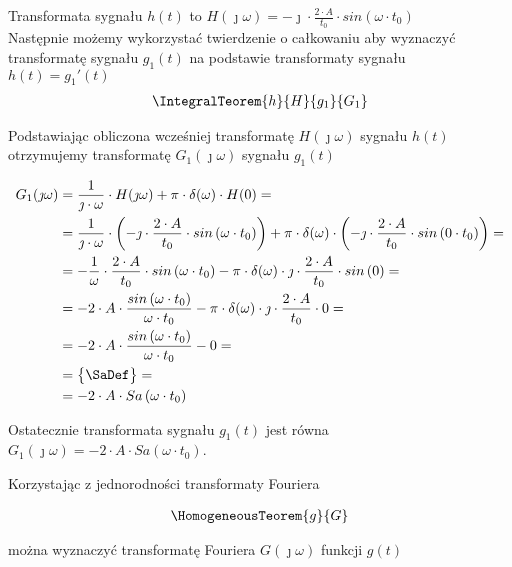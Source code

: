 \begin{task}
Transformata sygnału $h(t)$ to $H(\jmath \omega)=-\jmath \cdot \frac{2\cdot A}{t_0} \cdot sin\left( \omega \cdot t_0\right)$
\\

Następnie możemy wykorzystać twierdzenie o całkowaniu aby wyznaczyć transformatę sygnału $g_1(t)$ na podstawie transformaty sygnału $h(t)=g_1'(t)$
\begin{align*}
\IntegralTeorem{h}{H}{g_1}{G_1}
\end{align*}

Podstawiając obliczona wcześniej transformatę $H(\jmath \omega)$ sygnału $h(t)$ otrzymujemy transformatę $G_1(\jmath \omega)$ sygnału $g_1(t)$

\begin{align*}
G_1(\jmath \omega) &= \frac{1}{\jmath \cdot \omega} \cdot H(\jmath \omega) + \pi \cdot \delta(\omega) \cdot H(0)=\\
&=\frac{1}{\jmath \cdot \omega} \cdot \left(-\jmath \cdot \frac{2\cdot A}{t_0} \cdot sin\left( \omega \cdot t_0\right)\right) + \pi \cdot \delta(\omega) \cdot \left(-\jmath \cdot \frac{2\cdot A}{t_0} \cdot sin\left( 0 \cdot t_0\right)\right)=\\
&=-\frac{1}{\omega} \cdot \frac{2\cdot A}{t_0}\cdot sin\left( \omega \cdot t_0\right) - \pi \cdot \delta(\omega) \cdot \jmath \cdot \frac{2\cdot A}{t_0} \cdot sin\left( 0\right)=\\
&=-2\cdot A \cdot \frac{sin\left( \omega \cdot t_0\right)}{\omega \cdot t_0} - \pi \cdot \delta(\omega) \cdot \jmath \cdot \frac{2\cdot A}{t_0} \cdot 0=\\
&= -2\cdot A \cdot \frac{sin\left( \omega \cdot t_0\right)}{\omega \cdot t_0} - 0=\\
&=\begin{Bmatrix}
\SaDef
\end{Bmatrix}=\\
&=-2\cdot A \cdot Sa\left( \omega \cdot t_0\right)
\end{align*}

Ostatecznie transformata sygnału $g_1(t)$ jest równa $G_1(\jmath \omega)=- 2\cdot A \cdot Sa\left( \omega \cdot t_0\right)$.

Korzystając z jednorodności transformaty Fouriera 

\begin{align*}
\HomogeneousTeorem{g}{G}
\end{align*}

można wyznaczyć transformatę Fouriera $G(\jmath \omega)$ funkcji $g(t)$


\end{task}
